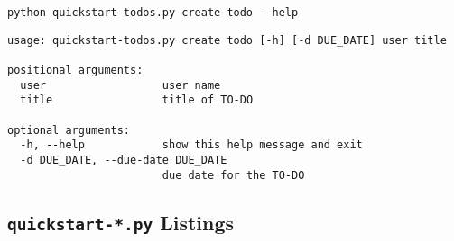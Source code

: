 \documentclass[10pt]{amsart}
\numberwithin{equation}{section}
\begin{document}
\begin{verbatim}
python quickstart-todos.py create todo --help
\end{verbatim}

\begin{verbatim}
usage: quickstart-todos.py create todo [-h] [-d DUE_DATE] user title

positional arguments:
  user                  user name
  title                 title of TO-DO

optional arguments:
  -h, --help            show this help message and exit
  -d DUE_DATE, --due-date DUE_DATE
                        due date for the TO-DO
\end{verbatim}

\newpage
\subsection{\texttt{quickstart-*.py} Listings}
\label{sec:org859416f}
\mbox{}
\end{document}
